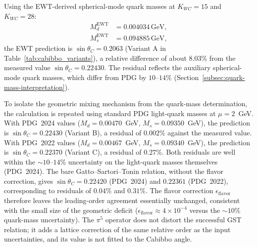 \documentclass[10pt,a4paper]{article}
\begin{document}
Using the EWT-derived spherical-mode quark masses at $K_{WC}=15$ and
$K_{WC}=28$:
\begin{align}
	M_d^{\text{EWT}} &= 0.004034\,\text{GeV}, \\
	M_s^{\text{EWT}} &= 0.094885\,\text{GeV},
\end{align}
the EWT prediction is $\sin\theta_C = 0.2063$ (Variant A in
Table~\ref{tab:cabibbo_variants}), a relative difference of about
$8.03\%$ from the measured value $\sin\theta_C = 0.22430$. The
residual reflects the auxiliary spherical-mode quark masses, which
differ from PDG by $10$--$14\%$
(Section~\ref{subsec:quark-mass-interpretation}).

To isolate the geometric mixing mechanism from the quark-mass
determination, the calculation is repeated using standard PDG
light-quark masses at $\mu = 2$~GeV. With PDG~2024 values
($M_d = 0.00470$~GeV, $M_s = 0.09350$~GeV), the prediction is
$\sin\theta_C = 0.22430$ (Variant B), a residual of $0.002\%$ against
the measured value. With PDG~2022 values
($M_d = 0.00467$~GeV, $M_s = 0.09340$~GeV), the prediction is
$\sin\theta_C = 0.22370$ (Variant C), a residual of $0.27\%$. Both
residuals are well within the $\sim 10$--$14\%$ uncertainty on the
light-quark masses themselves (PDG~2024). The bare
Gatto--Sartori--Tonin relation, without the flavor correction,
gives $\sin\theta_C = 0.22420$ (PDG~2024) and $0.22361$
(PDG~2022), corresponding to residuals of $0.04\%$ and $0.31\%$.
The flavor correction $\epsilon_{\text{flavor}}$ therefore leaves
the leading-order agreement essentially unchanged, consistent with
the small size of the geometric deficit ($\epsilon_{\text{flavor}}
\approx 4 \times 10^{-4}$ versus the $\sim 10\%$ quark-mass
uncertainty). The $\pi^5$ operator does not distort the successful
GST relation; it adds a lattice correction of the same relative
order as the input uncertainties, and its value is not fitted to
the Cabibbo angle.
\end{document}
